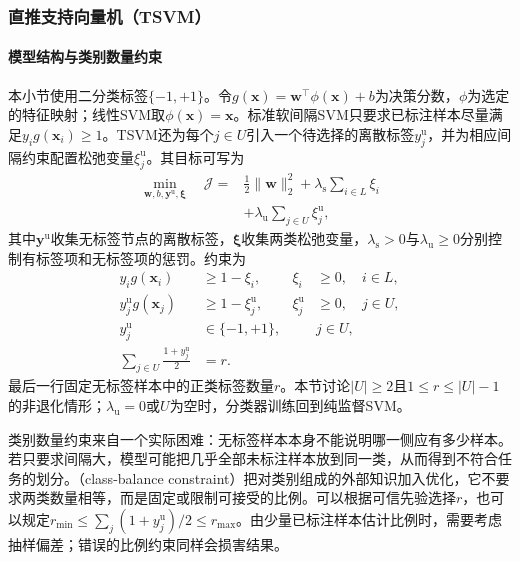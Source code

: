 \subsubsection{直推支持向量机（TSVM）}
\label{sec:classification-tsvm}

\paragraph{模型结构与类别数量约束}
\label{sec:classification-tsvm-structure}
本小节使用二分类标签$\{-1,+1\}$。令$g(\bm{x})=\bm{w}^{\top}\phi(\bm{x})+b$为决策分数，$\phi$为选定的特征映射；线性SVM取$\phi(\bm{x})=\bm{x}$。标准软间隔SVM只要求已标注样本尽量满足$y_i g(\bm{x}_i)\geq1$。TSVM还为每个$j\in U$引入一个待选择的离散标签$y_j^{\mathrm{u}}$，并为相应间隔约束配置松弛变量$\xi_j^{\mathrm{u}}$。其目标可写为
\begin{equation}
  \label{eq:classification-tsvm-objective}
  \begin{aligned}
    \min_{\bm{w},b,\bm{y}^{\mathrm{u}},\bm{\xi}}\quad
    \mathcal{J}
      ={}&\frac12\lVert\bm{w}\rVert_2^2
         +\lambda_{\mathrm{s}}\sum_{i\in L}\xi_i\\
       &+\lambda_{\mathrm{u}}\sum_{j\in U}\xi_j^{\mathrm{u}},
  \end{aligned}
\end{equation}
其中$\bm{y}^{\mathrm{u}}$收集无标签节点的离散标签，$\bm{\xi}$收集两类松弛变量，$\lambda_{\mathrm{s}}>0$与$\lambda_{\mathrm{u}}\geq0$分别控制有标签项和无标签项的惩罚。约束为
\begin{equation}
  \label{eq:classification-tsvm-constraints}
  \begin{aligned}
    y_i g(\bm{x}_i)&\geq1-\xi_i,
      &\xi_i&\geq0,\quad i\in L,\\
    y_j^{\mathrm{u}}g(\bm{x}_j)&\geq1-\xi_j^{\mathrm{u}},
      &\xi_j^{\mathrm{u}}&\geq0,\quad j\in U,\\
    y_j^{\mathrm{u}}&\in\{-1,+1\},
      &&j\in U,\\
    \sum_{j\in U}\frac{1+y_j^{\mathrm{u}}}{2}&=r.
  \end{aligned}
\end{equation}
最后一行固定无标签样本中的正类标签数量$r$。本节讨论$|U|\geq2$且$1\leq r\leq|U|-1$的非退化情形；$\lambda_{\mathrm{u}}=0$或$U$为空时，分类器训练回到纯监督SVM。

类别数量约束来自一个实际困难：无标签样本本身不能说明哪一侧应有多少样本。若只要求间隔大，模型可能把几乎全部未标注样本放到同一类，从而得到不符合任务的划分。（class-balance constraint）把对类别组成的外部知识加入优化，它不要求两类数量相等，而是固定或限制可接受的比例。可以根据可信先验选择$r$，也可以规定$r_{\min}\leq\sum_j(1+y_j^{\mathrm{u}})/2\leq r_{\max}$。由少量已标注样本估计比例时，需要考虑抽样偏差；错误的比例约束同样会损害结果。

